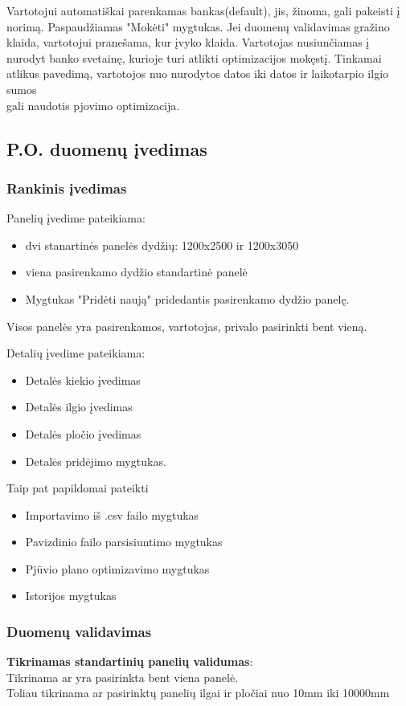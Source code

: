 \documentclass[a4paper,12pt]{article}
\begin{document}
Vartotojui automatiškai parenkamas bankas(default), jis, žinoma, gali pakeisti į norimą.
Paspaudžiamas "Mokėti" mygtukas.
Jei duomenų validavimas gražino klaida, vartotojui pranešama, kur įvyko klaida.
Vartotojas nusiunčiamas į nurodyt banko svetainę, kurioje turi atlikti optimizacijos mokęstį.
Tinkamai atlikus pavedimą, vartotojos nuo nurodytos datos iki datos ir laikotarpio ilgio sumos\\
gali naudotis pjovimo optimizacija.
	
\subsection{ P.O. duomenų įvedimas }

\subsubsection{Rankinis įvedimas}

Panelių įvedime pateikiama:
\begin{itemize}
	\item dvi stanartinės panelės dydžių: 1200x2500 ir 1200x3050
	\item viena pasirenkamo dydžio standartinė panelė
	\item Mygtukas "Pridėti naują" pridedantis pasirenkamo dydžio panelę. 
\end{itemize} 
Visos panelės yra pasirenkamos, vartotojas, privalo pasirinkti bent vieną.

Detalių įvedime pateikiama:
\begin{itemize}
	\item Detalės kiekio įvedimas
	\item Detalės ilgio įvedimas
	\item Detalės pločio įvedimas
	\item Detalės pridėjimo mygtukas.
\end{itemize}

Taip pat papildomai pateikti
\begin{itemize}
	\item Importavimo iš .csv failo mygtukas
	\item Pavizdinio failo parsisiuntimo mygtukas 
	\item Pjūvio plano optimizavimo mygtukas 
	\item Istorijos mygtukas
\end{itemize}

\subsubsection{Duomenų validavimas}
\textbf{Tikrinamas standartinių panelių validumas}:\\
	Tikrinama ar yra pasirinkta bent viena panelė. \\
	Toliau tikrinama ar pasirinktų panelių ilgai ir pločiai nuo 10mm iki 10000mm \\
\end{document}
